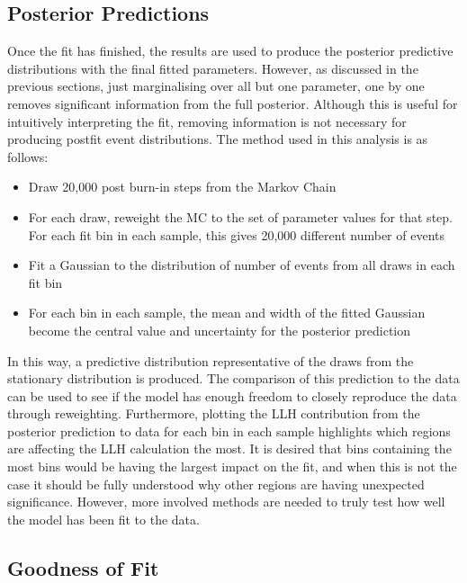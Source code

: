 \subsection{Posterior Predictions}\label{sec:postpred}

Once the fit has finished, the results are used to produce the posterior predictive distributions with the final fitted parameters. However, as discussed in the previous sections, just marginalising over all but one parameter, one by one removes significant information from the full posterior. Although this is useful for intuitively interpreting the fit, removing information is not necessary for producing postfit event distributions. The method used in this analysis is as follows:

\begin{itemize}
   \item Draw 20,000 post burn-in steps from the Markov Chain
   \item For each draw, reweight the MC to the set of parameter values for that step. For each fit bin in each sample, this gives 20,000 different number of events
   \item Fit a Gaussian to the distribution of number of events from all draws in each fit bin 
   \item For each bin in each sample, the mean and width of the fitted Gaussian become the central value and uncertainty for the posterior prediction
   \end{itemize}
   
In this way, a predictive distribution representative of the draws from the stationary distribution is produced. The comparison of this prediction to the data can be used to see if the model has enough freedom to closely reproduce the data through reweighting. Furthermore, plotting the LLH contribution from the posterior prediction to data for each bin in each sample highlights which regions are affecting the LLH calculation the most. It is desired that bins containing the most bins would be having the largest impact on the fit, and when this is not the case it should be fully understood why other regions are having unexpected significance. However, more involved methods are needed to truly test how well the model has been fit to the data.

\subsection{Goodness of Fit}\label{sec:pval}

